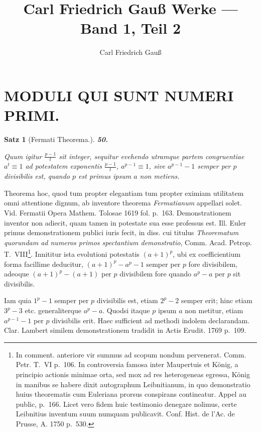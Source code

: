 \documentclass[12pt,a4paper]{article}
\title{Carl Friedrich Gau\ss{} Werke --- Band 1, Teil 2}
\author{Carl Friedrich Gau\ss{}}
\date{}
\theoremstyle{plain}
\newtheorem{satz}{Satz}[section]
\theoremstyle{definition}
\theoremstyle{remark}
\begin{document}
\maketitle


\section*{MODULI QUI SUNT NUMERI PRIMI.}

\setcounter{satz}{49}
\begin{satz}[Fermati Theorema.]
\setcounter{satz}{50}
\addtocounter{satz}{-1}
\textbf{50.}

Quum igitur $\frac{p-1}{t}$ sit integer, sequitur evehendo utramque partem congruentiae $a^t \equiv 1$ ad potestatem exponentis $\frac{p-1}{t}$, $a^{p-1} \equiv 1$, sive $a^{p-1} - 1$ semper per $p$ divisibilis est, quando $p$ est primus ipsum $a$ non metiens.
\end{satz}

Theorema hoc, quod tum propter elegantiam tum propter eximiam utilitatem omni attentione dignum, ab inventore theorema \emph{Fermatianum} appellari solet. Vid. Fermatii Opera Mathem. Tolosae 1619 fol. p.~163. Demonstrationem inventor non adiecit, quam tamen in potestate sua esse professus est. Ill. Euler primus demonstrationem publici iuris fecit, in diss. cui titulus \emph{Theorematum quorundam ad numeros primos spectantium demonstratio}, Comm. Acad. Petrop. T.~VIII\footnote{In comment. anteriore vir summus ad scopum nondum pervenerat. Comm. Petr. T.~VI p.~106. In controversia famosa inter Maupertuis et König, a principio actionis minimae orta, sed mox ad res heterogeneas egressa, König in manibus se habere dixit autographum Leibnitianum, in quo demonstratio huius theorematis cum Euleriana prorsus conspirans contineatur. Appel au public, p.~166. Licet vero fidem huic testimonio denegare nolimus, certe Leibnitius inventum suum numquam publicavit. Conf. Hist. de l'Ac. de Prusse, A. 1750 p.~530.}. Innititur ista evolutioni potestatis $(a+1)^p$, ubi ex coefficientium forma facillime deducitur, $(a+1)^p - a^p - 1$ semper per $p$ fore divisibilem, adeoque $(a+1)^p - (a+1)$ per $p$ divisibilem fore quando $a^p - a$ per $p$ sit divisibilis.

Iam quia $1^p - 1$ semper per $p$ divisibilis est, etiam $2^p - 2$ semper erit; hinc etiam $3^p - 3$ etc. generaliterque $a^p - a$. Quodsi itaque $p$ ipsum $a$ non metitur, etiam $a^{p-1} - 1$ per $p$ divisibilis erit. Haec sufficient ad methodi indolem declarandam. Clar. Lambert similem demonstrationem tradidit in Actis Erudit. 1769 p.~109.
\end{document}
